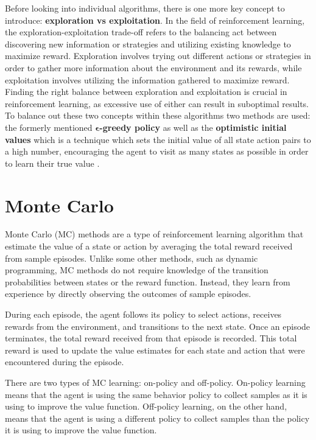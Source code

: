 Before looking into individual algorithms, there is one more key concept to introduce: \textbf{exploration vs exploitation}. In the field of reinforcement learning, the exploration-exploitation trade-off refers to the balancing act between discovering new information or strategies and utilizing existing knowledge to maximize reward. Exploration involves trying out different actions or strategies in order to gather more information about the environment and its rewards, while exploitation involves utilizing the information gathered to maximize reward. Finding the right balance between exploration and exploitation is crucial in reinforcement learning, as excessive use of either can result in suboptimal results. To balance out these two concepts within these algorithms two methods are used: the formerly mentioned \textbf{$\bm{\epsilon}$-greedy policy} as well as the \textbf{optimistic initial values} which is a technique which sets the initial value of all state action pairs to a high number, encouraging the agent to visit as many states as possible in order to learn their true value \citep{RLSuttonBarto}.

\section{Monte Carlo}
Monte Carlo (MC) methods are a type of reinforcement learning algorithm that estimate the value of a state or action by averaging the total reward received from sample episodes. Unlike some other methods, such as dynamic programming, MC methods do not require knowledge of the transition probabilities between states or the reward function. Instead, they learn from experience by directly observing the outcomes of sample episodes.

During each episode, the agent follows its policy to select actions, receives rewards from the environment, and transitions to the next state. Once an episode terminates, the total reward received from that episode is recorded. This total reward is used to update the value estimates for each state and action that were encountered during the episode.

There are two types of MC learning: on-policy and off-policy. On-policy learning means that the agent is using the same behavior policy to collect samples as it is using to improve the value function. Off-policy learning, on the other hand, means that the agent is using a different policy to collect samples than the policy it is using to improve the value function.

